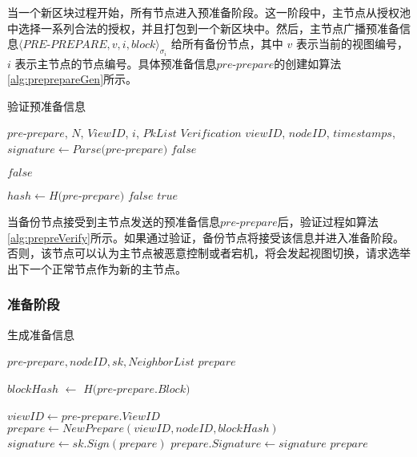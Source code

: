 当一个新区块过程开始，所有节点进入预准备阶段。这一阶段中，主节点从授权池中选择一系列合法的授权，并且打包到一个新区块中。然后，主节点广播预准备信息$\langle PRE$-$PREPARE, v, i, block \rangle_{\sigma_{i}}$ 给所有备份节点，其中 $v$ 表示当前的视图编号，$i$ 表示主节点的节点编号。具体预准备信息$pre$-$prepare$的创建如算法\ref{alg:preprepareGen}所示。

 \begin{algorithm}[H]
 \caption{验证预准备信息}
   \begin{algorithmic}[H]\label{alg:prepreVerify}
   \renewcommand{\algorithmicrequire}{\textbf{Input:}}
   \renewcommand{\algorithmicensure}{\textbf{Output:}}
   \REQUIRE $pre$-$prepare$, $N$, $ViewID$, $i$, $PkList$
   \ENSURE  $Verification$
    \STATE $viewID$, $nodeID$, $timestamps$, $signature \gets Parse(pre$-$prepare)$
      \RETURN $false$
    \ENDIF

      \RETURN $false$
    \ENDIF

    \STATE $hash \gets H(pre$-$prepare)$
      \RETURN $false$
    \ENDIF
   \RETURN $true$
   \end{algorithmic}
 \end{algorithm}

当备份节点接受到主节点发送的预准备信息$pre$-$prepare$后，验证过程如算法\ref{alg:prepreVerify}所示。如果通过验证，备份节点将接受该信息并进入准备阶段。否则，该节点可以认为主节点被恶意控制或者宕机，将会发起视图切换，请求选举出下一个正常节点作为新的主节点。

\subsubsection{准备阶段}

 \begin{algorithm}
 \caption{生成准备信息}
   \begin{algorithmic}[H]\label{alg:prepareGen}
   \renewcommand{\algorithmicrequire}{\textbf{Input:}}
   \renewcommand{\algorithmicensure}{\textbf{Output:}}
   \REQUIRE $pre$-$prepare, nodeID, sk, NeighborList$
   \ENSURE  $prepare$

    \STATE $blockHash$ $\gets$ $H(pre$-$prepare.Block)$

    \STATE $viewID \gets pre$-$prepare.ViewID$
    \STATE $prepare \gets NewPrepare(viewID, nodeID, blockHash)$
    \STATE $signature \gets sk.Sign(prepare)$
    \STATE $prepare.Signature \gets signature$
   \RETURN $prepare$
   \end{algorithmic}
 \end{algorithm}

